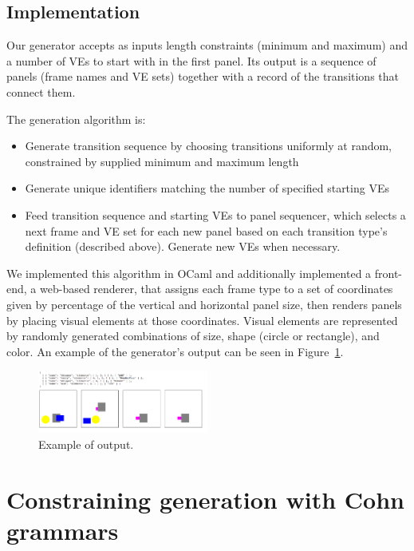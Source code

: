 \subsection{Implementation}

Our generator accepts as inputs length constraints (minimum and maximum)
and a number of VEs to start with in the first panel. Its output is a
sequence of panels (frame names and VE sets) together with a record of the
transitions that connect them.

The generation algorithm is:
\begin{itemize}
\item Generate transition sequence by choosing transitions uniformly at
random, constrained by supplied minimum and maximum length
\item Generate unique identifiers matching the number of specified starting
VEs
\item Feed transition sequence and starting VEs to panel sequencer, which
selects a next frame and VE set for each new panel based on each
transition type's definition (described above). Generate new VEs when
necessary.
\end{itemize}

We implemented this algorithm in OCaml and additionally implemented a
front-end, a web-based renderer, that assigns each frame type to a set of
coordinates given by percentage of the vertical and horizontal panel size,
then renders panels by placing visual elements at those coordinates. Visual
elements are represented by randomly generated combinations of size, shape
(circle or rectangle), and color.  An example of the generator's output can
be seen in Figure~\ref{fig:out1}.

\begin{figure}
\includegraphics[width=0.5\textwidth]{comicgen-unconstrained-ok.png}
\caption{Example of output.}
\label{fig:out1}
\end{figure}

\section{Constraining generation with Cohn grammars}

